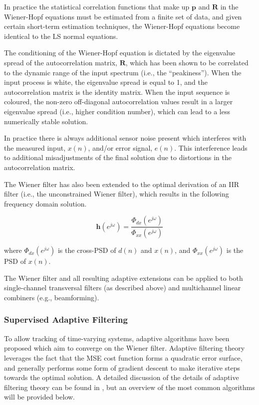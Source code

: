 In practice the statistical correlation functions that make up $\boldsymbol{p}$ and $\boldsymbol{R}$ in the Wiener-Hopf equations must be estimated from a finite set of data, and given certain short-term estimation techniques, the Wiener-Hopf equations become identical to the LS normal equations.

The conditioning of the Wiener-Hopf equation is dictated by the eigenvalue spread of the autocorrelation matrix, $\boldsymbol{R}$, which has been shown to be correlated to the dynamic range of the input spectrum (i.e., the “peakiness”). When the input process is white, the eigenvalue spread is equal to 1, and the autocorrelation matrix is the identity matrix. When the input sequence is coloured, the non-zero off-diagonal autocorrelation values result in a larger eigenvalue spread (i.e., higher condition number), which can lead to a less numerically stable solution.

In practice there is always additional sensor noise present which interferes with the measured input, $x(n)$, and/or error signal, $e(n)$. This interference leads to additional misadjustments of the final solution due to distortions in the autocorrelation matrix.

The Wiener filter has also been extended to the optimal derivation of an IIR filter (i.e., the unconstrained Wiener filter), which results in the following frequency domain solution.

\begin{equation}
	\boldsymbol{h}(e^{j\omega}) = \frac{\Phi_{dx}(e^{j\omega})}{\Phi_{xx}(e^{j\omega})}
\end{equation}

\noindent
where $\Phi_{dx}(e^{j\omega})$ is the cross-PSD of $d(n)$ and $x(n)$, and $\Phi_{xx}(e^{j\omega})$ is the PSD of $x(n)$.

The Wiener filter and all resulting adaptive extensions can be applied to both single-channel transversal filters (as described above) and multichannel linear combiners (e.g., beamforming). 

\subsubsection{Supervised Adaptive Filtering} \label{section:adaptive_filter}

To allow tracking of time-varying systems, adaptive algorithms have been proposed which aim to converge on the Wiener filter. Adaptive filtering theory leverages the fact that the MSE cost function forms a quadratic error surface, and generally performs some form of gradient descent to make iterative steps towards the optimal solution. A detailed discussion of the details of adaptive filtering theory can be found in \cite{farhang2013adaptive}, but an overview of the most common algorithms will be provided below.

